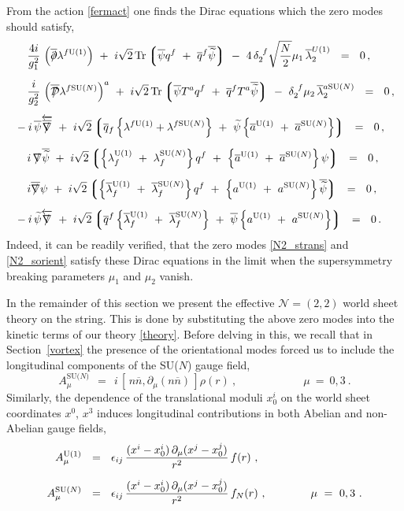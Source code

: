 \documentclass[12pt]{article}
\def\beq{\begin{equation}}
\def\eeq{\end{equation}}
\def\Tr{{\rm Tr}}
\newcommand{\ntwot}{${\mathcal N}= \left(2,2\right) $ }
\newcommand{\p}{\partial}
\newcommand{\wt}{\widetilde}
\newcommand{\ov}{\overline}
\newcommand{\md}{\mathcal{D}}
\newcommand{\lgr}{\left\lgroup}
\newcommand{\rgr}{\right\rgroup}
\def\slashed#1{\setbox0=\hbox{$#1$}             %
   \dimen0=\wd0                                 %
   \setbox1=\hbox{/} \dimen1=\wd1               %
   \ifdim\dimen0>\dimen1                        %
      \rlap{\hbox to \dimen0{\hfil/\hfil}}      %
      #1                                        %
   \else                                        %
      \rlap{\hbox to \dimen1{\hfil$#1$\hfil}}   %
      /                                         %
   \fi}                                        %
\newcommand{\aU}{a^{\rm U(1)}}
\newcommand{\aN}{a^\text{SU($N$)}}
\newcommand{\baU}{\ov{a}{}^{\rm U(1)}}
\newcommand{\baN}{\ov{a}{}^\text{SU($N$)}}
\newcommand{\nbar}{\ov{n}}
\begin{document}
	From the action \eqref{fermact} one finds the Dirac equations which the zero modes should satisfy,
\begin{align}
%
\notag
	&\phantom{-i}
	\frac{4i}{g_1^2}\, \left( \ov{\slashed{\p}}\lambda^{f {\rm U(1)}} \right) 
		~+~  i \sqrt{2}\, \Tr\lgr \ov{\psi} q^f  ~+~ \ov{q}{}^f \ov{\wt{\psi}} \rgr
		~-~ 4\, \delta_2^{\ f}\sqrt{\frac{N}{2}} \mu_1\, \ov{\lambda}^{U(1)}_2  ~~=~~ 0\,, 
		\\[2mm]
%
\notag
	&\phantom{-i}
	\frac{i}{g_2^2}\, \left( \ov{\slashed{\md}}\lambda^{f \text{SU($N$)}}\right)^a 
		~+~ i \sqrt{2}\, \Tr\lgr \ov{\psi}T^a q^f  ~+~  \ov{q}{}^f T^a \ov{\wt{\psi}} \rgr
		~-~ \delta_2^{\ f} \mu_2\, \ov{\lambda}{}_2^{a \text{SU($N$)}}  ~~=~~ 0 \,,\\[2mm]
%
\notag
	&
	-i\, \ov{\psi} \overleftarrow{\ov{\slashed{\nabla}}}
		~+~ i \sqrt{2} \lgr \ov{q}{}_f \left\{ \lambda^{f {\rm U(1)}} + \lambda^{f \text{SU($N$)}} \right\}
					~+~ \wt{\psi} \left\{ \baU  ~+~ \baN \right\} \rgr    ~~=~~ 0\,, \\[2mm]
%
\label{dirac}
	&\phantom{-i}
	i\, \slashed{\nabla} \ov{\wt{\psi}} 
		~+~ i \sqrt{2} \lgr \left\{ \lambda_f^{\rm U(1)} ~+~ \lambda_f^\text{SU($N$)} \right\} q^f
					~+~ \left\{ \baU ~+~ \baN \right\}\psi \rgr  ~~=~~ 0\,, \\[2mm]
%
\notag
	&\phantom{-i}
	i \ov{\slashed{\nabla}}\psi 
		~+~ i \sqrt{2} \lgr \left\{ \ov{\lambda}{}^{\rm U(1)}_f ~+~ \ov{\lambda}{}^\text{SU($N$)}_f \right\} q^f
					~+~ \left\{ \aU ~+~ \aN \right\} \ov{\wt{\psi}} \rgr   ~~=~~ 0 \,,\\[2mm]
%
\notag
	&
	-i\, \wt{\psi} \overleftarrow{\slashed{\nabla}}
		~+~ i \sqrt{2} \lgr \ov{q}{}^f \left\{ \ov{\lambda}{}_f^{\rm U(1)} ~+~ \ov{\lambda}{}_f^\text{SU($N$)} \right\}
					~+~ \ov{\psi} \left\{ \aU ~+~ \aN \right\} \rgr  ~~=~~ 0\,.
\end{align}
	Indeed, it can be readily verified, that the zero modes \eqref{N2_strans} and \eqref{N2_sorient} satisfy these
	Dirac equations in the limit when the supersymmetry breaking parameters $ \mu_1 $ and $ \mu_2 $ vanish.

	In the remainder of this section we present the effective \ntwot world sheet theory on the string.
	This is done by substituting the above zero modes into the kinetic terms of our theory \eqref{theory}.
	Before delving in this, we recall that in Section~\ref{vortex} the presence of the orientational modes
	forced us to include the longitudinal components of the SU($N$) gauge field,
\beq
\label{Aorlong}
	A_\mu^\text{SU($N$)} ~~=~~ i\, \left[\, n\nbar, \p_\mu(n\nbar)\, \right] \rho(r)~,   \qquad\qquad\qquad \mu~=~0, 3~.
\eeq
	Similarly, the dependence of the translational moduli $ x_0^i $ on the world sheet coordinates
	$ x^0 $, $ x^3 $ induces longitudinal contributions in both Abelian and non-Abelian gauge fields,
\begin{align}
%
\notag
	A_\mu^{\rm U(1)}	& ~~=~~ \epsilon_{ij}\,\frac{ (x^i - x_0^i)\,\p_\mu(x^j - x_0^j)} {r^2}\, f(r)~, \\[2mm]
%
\label{Atrlong}
	A_\mu^\text{SU($N$)}	& ~~=~~ \epsilon_{ij}\,\frac{ (x^i - x_0^i)\,\p_\mu(x^j - x_0^j)} {r^2}\, f_N(r)~,
				\qquad\qquad \mu~=~0, 3~.
\end{align}
\end{document}
